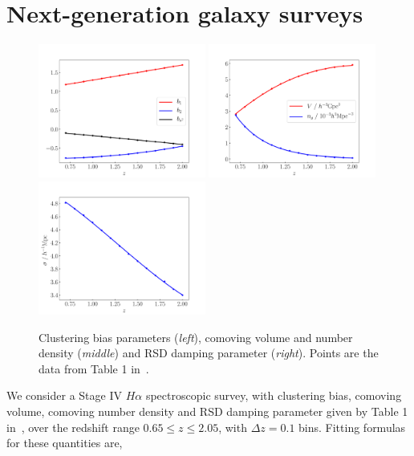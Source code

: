 \section{Next-generation galaxy surveys}
%
\begin{figure}[!ht]
\centering
\includegraphics[width=0.49\textwidth]{fig/b-eps-converted-to}
\includegraphics[width=0.49\textwidth]{fig/V_n-eps-converted-to} 
\includegraphics[width=0.49\textwidth]{fig/sigma-eps-converted-to}
\caption{Clustering bias parameters ({\em left}), comoving volume and number density ({\em middle}) and RSD damping parameter ({\em right}). Points are the data from Table 1 in~\cite{Yankelevich:2018uaz}.}
\label{fig1}
\end{figure}
%
We consider a Stage IV $H\alpha$ spectroscopic survey, with clustering bias, comoving volume, comoving number density and RSD damping parameter given by Table 1 in~\cite{Yankelevich:2018uaz}, over the redshift range $0.65\leq z\leq 2.05$, with $\Delta z=0.1$ bins. 
Fitting formulas for these quantities are, 
